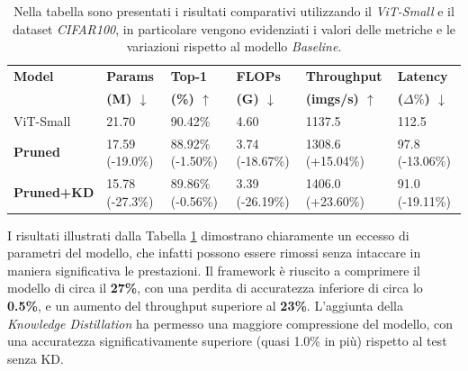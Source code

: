 \begin{table}[H]
    \centering
    \footnotesize
    \setlength{\tabcolsep}{4pt}
    \begin{tabular}{@{} l l l l l l @{}}
        \toprule
        \textbf{Model} & \textbf{Params} & \textbf{Top-1} & \textbf{FLOPs} & \textbf{Throughput} & \textbf{Latency} \\ 
                       & \textbf{(M) $\downarrow$}    & \textbf{(\%) $\uparrow$}  & \textbf{(G) $\downarrow$}   & \textbf{(imgs/s) $\uparrow$} & \textbf{($\Delta\%$) $\downarrow$} \\ 
        \midrule
        ViT-Small      & 21.70\hphantom{ (-19.0\%)} & 90.42\%\hphantom{ (-1.50\%)} & 4.60\hphantom{ (-18.67\%)} & 1137.5\hphantom{ (+15.04\%)} & 112.5\hphantom{ (-13.06\%)} \\
        \midrule
        \textbf{Pruned}    & 17.59 (-19.0\%)           & 88.92\% (-1.50\%)           & 3.74 (-18.67\%)           & 1308.6 (+15.04\%)           & \hphantom{0}97.8 (-13.06\%) \\
        \midrule
        \textbf{Pruned+KD} & 15.78 (-27.3\%)           & 89.86\% (-0.56\%)           & 3.39 (-26.19\%)           & 1406.0 (+23.60\%)           & \hphantom{0}91.0 (-19.11\%) \\
        \bottomrule
    \end{tabular}
    \vspace{10pt}
    \caption{Nella tabella sono presentati i risultati comparativi utilizzando il \textit{ViT-Small} e il dataset \textit{CIFAR100}, in particolare vengono evidenziati i valori delle metriche e le variazioni rispetto al modello \textit{Baseline}.}
    \label{tab:risultati-cifar100}
\end{table}
I risultati illustrati dalla Tabella \ref{tab:risultati-cifar100} dimostrano chiaramente un eccesso di parametri del modello, che infatti possono essere rimossi senza intaccare in maniera significativa le prestazioni. Il framework è riuscito a comprimere il modello di circa il \textbf{27\%}, con una perdita di accuratezza inferiore di circa lo \textbf{0.5\%}, e un aumento del throughput superiore al \textbf{23\%}. L'aggiunta della \textit{Knowledge Distillation} ha permesso una maggiore compressione del modello, con una accuratezza significativamente superiore (quasi 1.0\% in più) rispetto al test senza KD.

